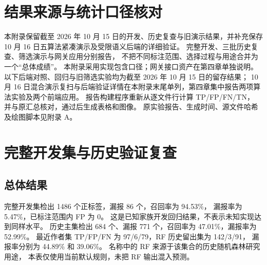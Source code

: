 \section{结果来源与统计口径核对}
本附录保留截至 2026 年 10 月 15 日的开发、历史复查与旧演示结果，并补充保存 10 月 16 日五算法紧凑演示及受限语义后端的详细验证。
完整开发、三批历史复查、筛选演示与网关应用分别报告，
不把不同标注范围、选择过程与用途合并为一个“总体成绩”。
本附录采用实现包含口径；网关接口资产在第四章单独说明。
以下后端对照、回归与旧筛选实验均为截至 2026 年 10 月 15 日的留存结果；
10 月 16 日混合演示复扫与后端验证详情在本附录末尾单列，第四章集中报告两项算法实验及两个前端应用。
报告构建程序重新从逐文件行计算 TP/FP/FN/TN，
并与原汇总核对，通过后生成表格和图像。
原实验报告、生成时间、源文件哈希及绘图脚本见附录 A。

\section{完整开发集与历史验证复查}
\subsection{总体结果}
\begin{table}[htbp]\centering\small
\caption{主集合实现包含结果；历史集合是已观察数据的复查}\label{tab:overall-results}
\end{table}

完整开发集检出 1486 个正标签，漏报 86 个，召回率为 94.53\%，
漏报率为 5.47\%，已标注范围内 FP 为 0。
这是已知家族开发回归结果，不表示未知实现达到同样水平。
历史主集检出 684 个、漏报 771 个，召回率为 47.01\%，漏报率为 52.99\%。
最近作者集 TP/FP/FN 为 97/6/79，RF 历史留出集为 142/3/91，
漏报率分别为 44.89\% 和 39.06\%。
名称中的 RF 来源于该集合的历史随机森林研究用途，
本表仅使用当前默认规则，未把 RF 输出混入预测。

